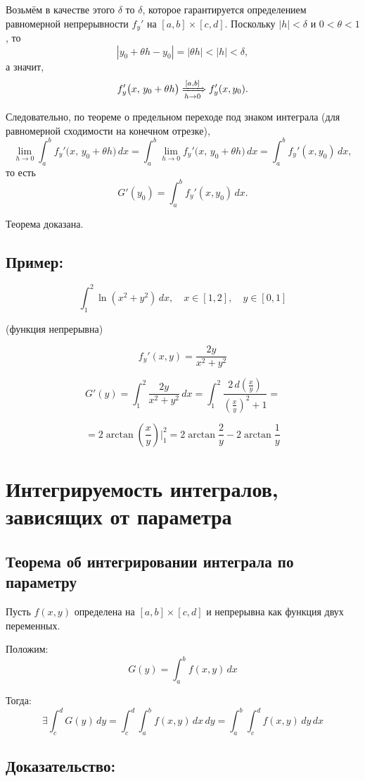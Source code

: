 \documentclass{article}
\begin{document}
Возьмём в качестве этого $\delta$ то $\delta$, которое гарантируется определением равномерной непрерывности $f_y'$ на $[a,b] \times [c,d]$.  
Поскольку $|h| < \delta$ и $0 < \theta < 1$, то
\[
|y_0 + \theta h - y_0| = |\theta h| < |h| < \delta,
\]
а значит,
\[
f_y'\bigl(x,\,y_0 + \theta h\bigr) \xRightarrow[h \to 0]{[a,b]} f_y'(x, y_0).
\]

Следовательно, по теореме о предельном переходе под знаком интеграла (для равномерной сходимости на конечном отрезке),
\[
\lim_{h \to 0} \int_a^b f_y'\bigl(x,\, y_0 + \theta h\bigr)\,dx 
= \int_a^b \lim_{h \to 0} f_y'\bigl(x,\, y_0 + \theta h\bigr)\,dx 
= \int_a^b f_y'(x, y_0)\,dx,
\]
то есть
\[
G'(y_0) = \int_a^b f_y'(x, y_0)\,dx.
\]

Теорема доказана.

\subsection*{Пример:}

\[
\int_1^2 \ln(x^2 + y^2)\,dx, \quad x \in [1,2], \quad y \in [0,1]
\]

(функция непрерывна)

\[
f_y'(x,y) = \frac{2y}{x^2 + y^2}
\]

\[
G'(y) = \int_1^2 \frac{2y}{x^2 + y^2}\,dx = \int_1^2 \frac{2\,d\left(\frac{x}{y}\right)}{\left(\frac{x}{y}\right)^2 + 1} =
\]

\[
= 2 \arctan\left(\frac{x}{y}\right) \Big|_1^2 = 2 \arctan\frac{2}{y} - 2 \arctan\frac{1}{y}
\]

\section*{Интегрируемость интегралов, зависящих от параметра}

\subsection*{Теорема об интегрировании интеграла по параметру}

Пусть $f(x,y)$ определена на $[a,b] \times [c,d]$ и непрерывна как функция двух переменных.

Положим:
\[
G(y) = \int_a^b f(x,y)\,dx
\]

Тогда:
\[
\exists \int_c^d G(y)\,dy = \int_c^d \int_a^b f(x,y)\,dx\,dy = \int_a^b \int_c^d f(x,y)\,dy\,dx
\]

\subsection*{Доказательство:}
\end{document}
